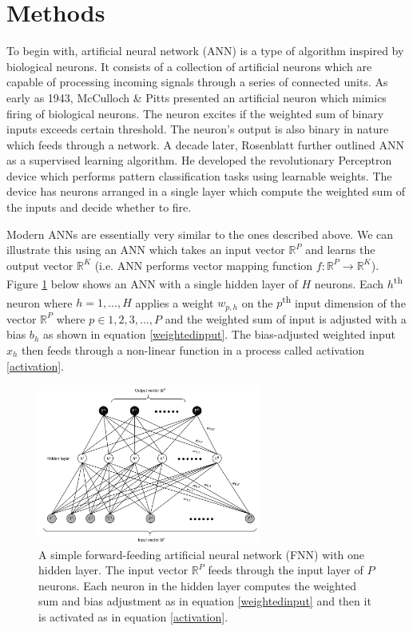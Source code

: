 \documentclass[11pt]{article} %
\theoremstyle{plain}
\theoremstyle{definition}
\begin{document}
\newpage
\section{Methods}

To begin with, artificial neural network (ANN) is a type of algorithm inspired by biological neurons. It consists of a collection of artificial neurons which are capable of processing incoming signals through a series of connected units. As early as 1943, McCulloch \& Pitts \cite{mcculloch} presented an artificial neuron which mimics firing of biological neurons. The neuron excites if the weighted sum of binary inputs exceeds certain threshold. The neuron’s output is also binary in nature which feeds through a network. A decade later, Rosenblatt \cite{rosenblatt} further outlined ANN as a supervised learning algorithm. He developed the revolutionary Perceptron device which performs pattern classification tasks using learnable weights. The device has neurons arranged in a single layer which compute the weighted sum of the inputs and decide whether to fire. 

Modern ANNs are essentially very similar to the ones described above. We can illustrate this using an ANN which takes an input vector \(\mathbb{R}^P\) and learns the output vector \(\mathbb{R}^K\) (i.e. ANN performs vector mapping function \(f: \mathbb{R}^P\rightarrow\mathbb{R}^K \)). Figure \ref{fig:ann} below shows an ANN with a single hidden layer of \(H\) neurons. Each \(h\)\textsuperscript{th} neuron where \(h=1,...,H\) applies a weight \(w_{p,h}\) on the \(p\)\textsuperscript{th} input dimension of the vector \(\mathbb{R}^P\) where \(p\in{1,2,3,...,P}\) and the weighted sum of input is adjusted with a bias \(b_h\) as shown in equation \ref{weightedinput}. The bias-adjusted weighted input \(x_h\) then feeds through a non-linear function in a process called activation \eqref{activation}. 

\begin{figure}[H]
	\centering
	\includegraphics[width=0.65\textwidth]{ann.PNG}
	\caption{A simple forward-feeding artificial neural network (FNN) with one hidden layer. The input vector \(\mathbb{R}^P\) feeds through the input layer of \(P\) neurons. Each neuron in the hidden layer computes the weighted sum and bias adjustment as in equation \ref{weightedinput} and then it is activated as in equation \ref{activation}.}
	\label{fig:ann}
\end{figure}
\end{document}
